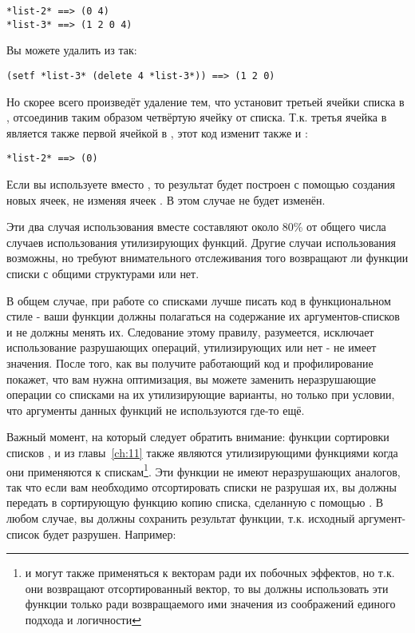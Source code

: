 \begin{lstlisting}
*list-2* ==> (0 4)
*list-3* ==> (1 2 0 4)
\end{lstlisting}

Вы можете удалить  из  так:

\begin{lstlisting}
(setf *list-3* (delete 4 *list-3*)) ==> (1 2 0)
\end{lstlisting}

Но  скорее всего произведёт удаление тем, что установит  третьей
ячейки списка в , отсоединив таким образом четвёртую ячейку от
списка. Т.к. третья ячейка в  является также первой ячейкой в ,
этот код изменит также и :

\begin{lstlisting}
*list-2* ==> (0)
\end{lstlisting}

Если вы используете  вместо , то результат будет построен с
помощью создания новых ячеек, не изменяя ячеек . В этом случае 
не будет изменён.

Эти два случая использования вместе составляют около 80\% от общего числа случаев
использования утилизирующих функций. Другие случаи использования возможны, но требуют
внимательного отслеживания того возвращают ли функции списки с общими структурами или нет.

В общем случае, при работе со списками лучше писать код в функциональном стиле - ваши
функции должны полагаться на содержание их аргументов-списков и не должны менять
их. Следование этому правилу, разумеется, исключает использование разрушающих операций,
утилизирующих или нет - не имеет значения. После того, как вы получите работающий код и
профилирование покажет, что вам нужна оптимизация, вы можете заменить неразрушающие
операции со списками на их утилизирующие варианты, но только при условии, что аргументы
данных функций не используются где-то ещё.

Важный момент, на который следует обратить внимание: функции сортировки списков
,  и  из главы~\ref{ch:11} также являются
утилизирующими функциями когда они применяются к спискам\footnote{ и
   могут также применяться к векторам ради их побочных эффектов, но
  т.к. они возвращают отсортированный вектор, то вы должны использовать эти функции только
  ради возвращаемого ими значения из соображений единого подхода и логичности}. Эти
функции не имеют неразрушающих аналогов, так что если вам необходимо отсортировать списки
не разрушая их, вы должны передать в сортирующую функцию копию списка, сделанную с помощью
. В любом случае, вы должны сохранить результат функции, т.к. исходный
аргумент-список будет разрушен. Например:

